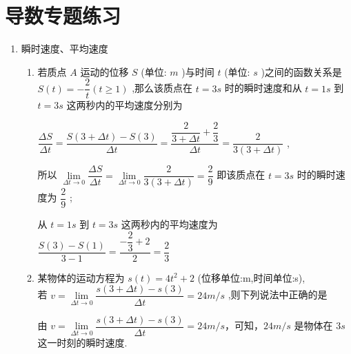 \chapter*{导数专题练习}
\begin{enumerate}
    \item 瞬时速度、平均速度
    \begin{enumerate}
        \item 若质点 $A$ 运动的位移 $S$ (单位: ${m}$ )与时间 $t$ (单位: ${s}$ )之间的函数关系是 $S\left( t\right)  =  - \dfrac{2}{t}\left( {t \geq  1}\right)$ ,那么该质点在 $t = 3{s}$ 时的瞬时速度和从 $t = 1{s}$ 到 $t = 3{s}$ 这两秒内的平均速度分别为

        \begin{jieda}
            $\dfrac{\Delta S}{\Delta t} = \dfrac{S\left( {3 + {\Delta t}}\right)  - S\left( 3\right) }{\Delta t} = \dfrac{\dfrac{2}{3 + {\Delta t}} + \dfrac{2}{3}}{\Delta t} = \dfrac{2}{3\left( {3 + {\Delta t}}\right) }$ ,
            
            所以 $\mathop{\lim }\limits_{{{\Delta t} \rightarrow  0 }}\dfrac{\Delta S}{\Delta t} = \mathop{\lim }\limits_{{{\Delta t} \rightarrow  0 }}\dfrac{2}{3\left( {3 + {\Delta t}}\right) } = \dfrac{2}{9}$ 即该质点在 $t = {3s}$ 时的瞬时速度为 $\dfrac{2}{9}$ ;
            
            从 $t = 1{s}$ 到 $t = 3{s}$ 这两秒内的平均速度为 $\dfrac{S\left( 3\right)  - S\left( 1\right) }{3 - 1} = \dfrac{-\dfrac{2}{3} + 2}{2} = \dfrac{2}{3}$
        \end{jieda}
        
        \item 某物体的运动方程为 $s\left( t\right)  = 4{t}^{2} + 2$ (位移单位:m,时间单位:s), \\若 $v = \mathop{\lim }\limits_{{{\Delta t} \rightarrow  0 }}\dfrac{s\left( {3 + {\Delta t}}\right)  - s\left( 3\right) }{\Delta t} = {24}{m}/{s}$ ,则下列说法中正确的是
        \begin{jieda}
            由 $v = \mathop{\lim }\limits_{{{\Delta t} \rightarrow  0 }}\dfrac{s\left( {3 + {\Delta t}}\right)  - s\left( 3\right) }{\Delta t} = {24}{m}/{s}$，可知，$24m/s$ 是物体在 ${{3s}}$ 这一时刻的瞬时速度.
        \end{jieda}
        

\end{enumerate}
\end{enumerate}
